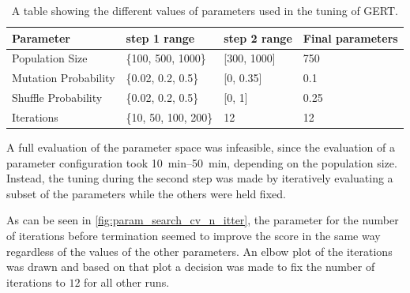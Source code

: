 \begin{table}
    \centering
    \begin{tabular}{@{}llll@{}}
    \toprule
    Parameter            & step 1 range         & step 2 range    & Final parameters \\ \midrule
    Population Size      & \{100, 500, 1000\}   & {[}300, 1000{]} & 750              \\
    Mutation Probability & \{0.02, 0.2, 0.5\}   & {[}0, 0.35{]}   & 0.1              \\
    Shuffle Probability  & \{0.02, 0.2, 0.5\}   & {[}0, 1{]}      & 0.25             \\
    Iterations           & \{10, 50, 100, 200\} & 12              & 12               \\ \bottomrule
    \end{tabular}
    \caption{A table showing the different values of parameters used in the tuning of GERT.}
    \label{tab:param_range}
\end{table}

A full evaluation of the parameter space was infeasible, since the evaluation of a parameter configuration took \SIrange{10}{50}{\minute}, depending on the population size.
Instead, the tuning during the second step was made by iteratively evaluating a subset of the parameters while the others were held fixed.

As can be seen in \cref{fig:param_search_cv_n_itter}, the parameter for the number of iterations before termination seemed to improve the score in the same way regardless of the values of the other parameters.
An elbow plot of the iterations was drawn and based on that plot a decision was made to fix the number of iterations to $12$ for all other runs.

